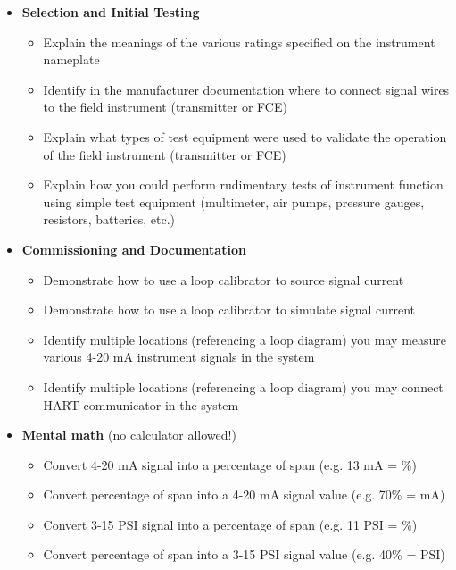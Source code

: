 \documentclass[12pt,a4paper]{book}
\begin{document}
\vfil \eject

\noindent
{} 

\begin{itemize}
\item{} {\bf Selection and Initial Testing}
\begin{itemize}

\item{} Explain the meanings of the various ratings specified on the instrument nameplate
\item{} Identify in the manufacturer documentation where to connect signal wires to the field instrument (transmitter or FCE)
\item{} Explain what types of test equipment were used to validate the operation of the field instrument (transmitter or FCE)
\item{} Explain how you could perform rudimentary tests of instrument function using simple test equipment (multimeter, air pumps, pressure gauges, resistors, batteries, etc.)
\end{itemize}
\end{itemize}

\filbreak

\begin{itemize}
\item{} {\bf Commissioning and Documentation}
\begin{itemize}

\item{} Demonstrate how to use a loop calibrator to source signal current
\item{} Demonstrate how to use a loop calibrator to simulate signal current
\item{} Identify multiple locations (referencing a loop diagram) you may measure various 4-20 mA instrument signals in the system
\item{} Identify multiple locations (referencing a loop diagram) you may connect HART communicator in the system
\end{itemize}
\end{itemize}

\filbreak

\begin{itemize}
\item{} {\bf Mental math} (no calculator allowed!)
\begin{itemize}

\item{} Convert 4-20 mA signal into a percentage of span (e.g. 13 mA = \underbar{\hskip 20pt}\%)
\item{} Convert percentage of span into a 4-20 mA signal value (e.g. 70\% = \underbar{\hskip 20pt} mA)
\item{} Convert 3-15 PSI signal into a percentage of span (e.g. 11 PSI = \underbar{\hskip 20pt}\%)
\item{} Convert percentage of span into a 3-15 PSI signal value (e.g. 40\% = \underbar{\hskip 20pt} PSI)
\end{itemize}
\end{itemize}
\end{document}
